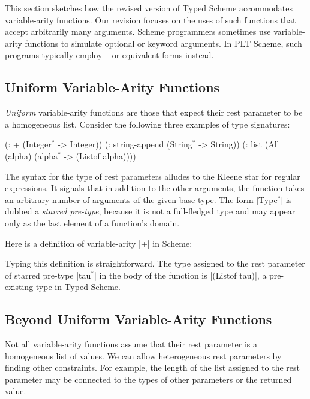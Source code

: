 \begin{schemeregion}
This section sketches how the revised version of Typed Scheme accommodates
 variable-arity functions. Our revision focuses on the uses of
 such functions that accept arbitrarily many arguments. Scheme
 programmers sometimes use variable-arity functions to simulate
 optional or keyword arguments. In PLT Scheme, such programs typically employ
 ~\cite{dybvig-case-lambda} or equivalent 
 forms instead. 


\subsection{Uniform Variable-Arity Functions}
\label{ssec:uni-va}

\emph{Uniform} variable-arity functions are those that expect their rest parameter to be a
 homogeneous list.  Consider the following three examples of type signatures:
\begin{schemedisplay}
(: + (Integer$^*$ -> Integer))
(: string-append (String$^*$ -> String))
(: list (All (alpha) (alpha$^*$ -> (Listof alpha))))
\end{schemedisplay}
 The syntax  for the type of rest parameters alludes to
 the Kleene star for regular expressions.  It signals that in addition to
 the other arguments, the function takes an arbitrary number of arguments
 of the given base type.  The form \scheme|Type$^*$| is dubbed a {\em
 starred pre-type}, because it is not a full-fledged type and may appear
 only as the last element of a function's domain.

Here is a definition of variable-arity \scheme|+| in
Scheme:
%

\noindent Typing this definition is straightforward. The
 type assigned to the rest parameter of starred pre-type \scheme|tau$^*$|
 in the body of the function is \scheme|(Listof tau)|, a
 pre-existing type in Typed Scheme.

\subsection{Beyond Uniform Variable-Arity Functions}
\label{ssec:beyond-uva}

Not all variable-arity functions assume that their rest parameter is a
homogeneous list of values.  We can allow heterogeneous rest
parameters by finding other constraints.  For example, the length of
the list assigned to the rest parameter may be connected to the types of
other parameters or the returned value.


\end{schemeregion}
